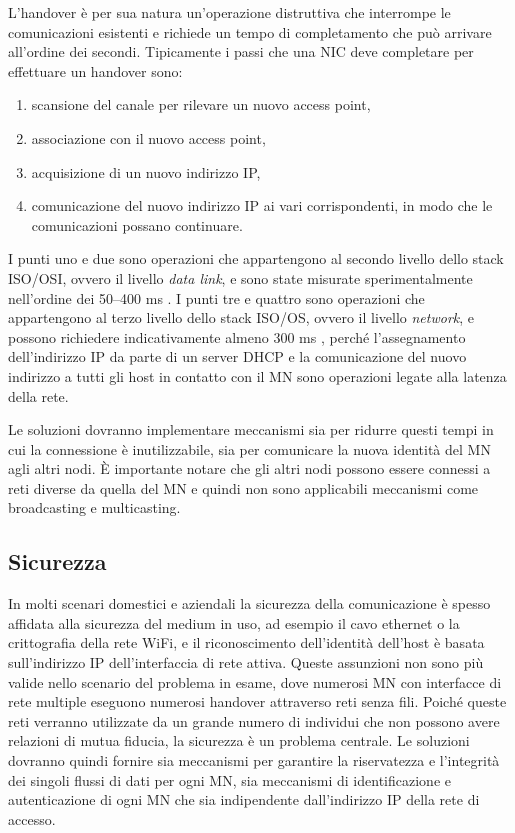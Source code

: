 \documentclass[12pt,a4paper,openright,twoside,draft]{book}
\begin{document}
L'handover è per sua natura un'operazione distruttiva che interrompe
le comunicazioni esistenti e richiede un tempo di completamento che
può arrivare all'ordine dei secondi. Tipicamente i passi che una NIC
deve completare per effettuare un handover sono:
\begin{enumerate}
\item scansione del canale per rilevare un nuovo access point,
\item associazione con il nuovo access point,
\item acquisizione di un nuovo indirizzo IP,
\item comunicazione del nuovo indirizzo IP ai vari corrispondenti, in
  modo che le comunicazioni possano continuare.
\end{enumerate}
I punti uno e due sono operazioni che appartengono al secondo livello
dello stack ISO/OSI, ovvero il livello \emph{data link}, e sono state
misurate sperimentalmente nell'ordine dei 50--400 ms
\cite{bib:misura-handoff-l2}. I punti tre e quattro sono operazioni
che appartengono al terzo livello dello stack ISO/OS, ovvero il
livello \emph{network}, e possono richiedere indicativamente almeno
300 ms \cite{bib:misura-handoff-dhcp}, perché l'assegnamento
dell'indirizzo IP da parte di un server DHCP e la comunicazione del
nuovo indirizzo a tutti gli host in contatto con il MN sono operazioni
legate alla latenza della rete.

Le soluzioni dovranno implementare meccanismi sia per ridurre questi
tempi in cui la connessione è inutilizzabile, sia per comunicare la
nuova identità del MN agli altri nodi. È importante notare che gli
altri nodi possono essere connessi a reti diverse da quella del MN e
quindi non sono applicabili meccanismi come broadcasting e
multicasting.

\subsection{Sicurezza}
In molti scenari domestici e aziendali la sicurezza della
comunicazione è spesso affidata alla sicurezza del medium in uso, ad
esempio il cavo ethernet o la crittografia della rete WiFi, e il
riconoscimento dell'identità dell'host è basata sull'indirizzo IP
dell'interfaccia di rete attiva. Queste assunzioni non sono più valide
nello scenario del problema in esame, dove numerosi MN con interfacce
di rete multiple eseguono numerosi handover attraverso reti senza
fili. Poiché queste reti verranno utilizzate da un grande numero di
individui che non possono avere relazioni di mutua fiducia, la
sicurezza è un problema centrale. Le soluzioni dovranno quindi fornire
sia meccanismi per garantire la riservatezza e l'integrità dei singoli
flussi di dati per ogni MN, sia meccanismi di identificazione e
autenticazione di ogni MN che sia indipendente dall'indirizzo IP della
rete di accesso.
\end{document}
